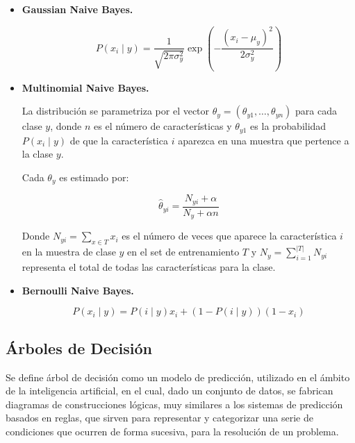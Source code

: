 \begin{itemize}
	
	\item \textbf{Gaussian Naive Bayes.}
	
	\begin{equation}
		P(x_i \mid y) = \frac{1}{\sqrt{2\pi\sigma^2_y}} \exp\left(-\frac{(x_i - \mu_y)^2}{2\sigma^2_y}\right)
	\end{equation}
	
	\item \textbf{Multinomial Naive Bayes.}
	
	La distribución se parametriza por el vector $\theta_y = (\theta_{y1},\ldots,\theta_{yn})$ para cada clase $y$, donde $n$ es el número de características y $\theta_{y1}$ es la probabilidad $P(x_i \mid y)$ de que la característica $i$ aparezca en una muestra que pertence a la clase $y$.
	
	Cada $\theta_y$ es estimado por:
	
	\begin{equation}		
		\hat{\theta}_{yi} = \frac{ N_{yi} + \alpha}{N_y + \alpha n}		
	\end{equation}
	
	Donde $N_{yi} = \sum_{x \in T} x_i$ es el número  de veces que aparece la característica $i$ en la muestra de clase $y$ en el set de entrenamiento $T$ y $N_{y} = \sum_{i=1}^{|T|} N_{yi}$ representa el total de todas las características para la clase.
	
	\item \textbf{Bernoulli Naive Bayes.}
	
	\begin{equation}
		P(x_i \mid y) = P(i \mid y) x_i + (1 - P(i \mid y)) (1 - x_i)
	\end{equation}
	
\end{itemize}

\subsection{Árboles de Decisión}

Se define árbol de  decisión como un modelo de predicción, utilizado en el ámbito de la inteligencia artificial, en el cual,  dado un conjunto de datos, se fabrican diagramas de construcciones lógicas, muy similares a los sistemas de predicción basados en reglas, que sirven para representar y categorizar una serie de condiciones que ocurren de forma sucesiva, para la resolución de un problema.  

